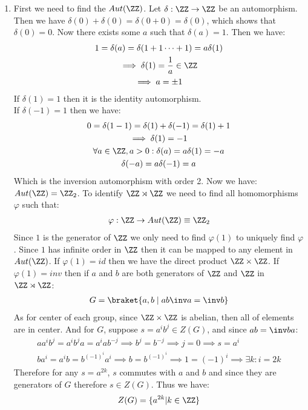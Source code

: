 \begin{enumerate}[label=]
    \item 
        First we need to find the $Aut(\ZZ)$. Let $\delta: \ZZ \to \ZZ$ be an automorphism. Then we have $\delta(0) + \delta(0) = \delta(0 + 0) = \delta(0)$, which shows that $\delta(0) = 0$. Now there exists some $a$ such that $\delta(a) = 1$. Then we have:
        \begin{gather*}
            1 = \delta(a) = \delta(1 + 1 \dots + 1) = a \delta(1) \\
            \implies \delta(1) = \frac{1}{a} \in \ZZ  \\
            \implies a = \pm 1
        \end{gather*}
        If $\delta(1) = 1$ then it is the identity automorphism. \\
        If $\delta(-1) = 1$ then we have: 
        \begin{gather*}
            0 = \delta(1 - 1) = \delta(1) + \delta(-1) = \delta(1) + 1 \\
            \implies \delta(1) = -1 \\
            \forall a \in \ZZ, a > 0: \delta(a) = a \delta(1) = -a \\
            \delta(-a) = a \delta(-1) = a
        \end{gather*}
        Which is the inversion automorphism with order 2. Now we have: $Aut(\ZZ) = \ZZ_2$. To identify $\ZZ \rtimes \ZZ$ we need to find all homomorphisms $\varphi$ such that:
        \begin{gather*}
            \varphi : \ZZ \to Aut(\ZZ) \equiv \ZZ_2
        \end{gather*}
        Since $1$ is the generator of $\ZZ$ we only need to find $\varphi(1)$ to uniquely find $\varphi$. Since $1$ has infinite order in $\ZZ$ then it can be mapped to any element in $Aut(\ZZ)$. If $\varphi(1) = id$ then we have the direct product $\ZZ \times \ZZ$.
        If $\varphi(1) = inv$ then if $a$ and $b$ are both generators of $\ZZ$ and $\ZZ$ in $\ZZ \rtimes \ZZ$:
        \begin{gather*}
            G = \braket{a, b \mid ab \inv a = \inv b}
        \end{gather*}
        As for center of each group, since $\ZZ \times \ZZ$ is abelian, then all of elements are in center. 
        And for $G$, suppose $s = a^i b^j \in Z(G)$, and since $ab = \inv b a$:
        \begin{gather*}
            a a^i b^j = a^i b^j a = a^i a b^{-j} \implies b^j = b^{-j} \implies j = 0 \implies s = a^i \\
            b a^i = a^i b = b^{(-1)^i} a^i \implies b = b^{(-1)^i} \implies 1 = (-1)^i \implies \exists k: i = 2k
        \end{gather*}
        Therefore for any $s = a^{2k}$, $s$ commutes with $a$ and $b$ and since they are generators of $G$ therefore $s \in Z(G)$. Thus we have:
        \begin{gather*}
            Z(G) = \{a^{2k}| k \in \ZZ \}
        \end{gather*}
\end{enumerate}